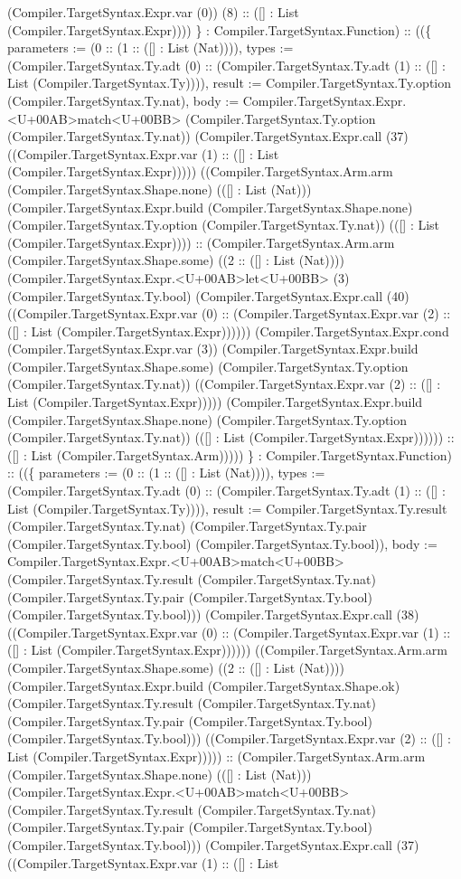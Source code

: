 \documentclass[11pt]{article}
\begin{document}
(Compiler.TargetSyntax.Expr.var (0)) (8) :: ([] : List (Compiler.TargetSyntax.Expr)))) \} : Compiler.TargetSyntax.Function) :: ((\{ parameters := (0 :: (1 :: ([] : List (Nat)))), types := (Compiler.TargetSyntax.Ty.adt (0) :: (Compiler.TargetSyntax.Ty.adt (1) :: ([] : List (Compiler.TargetSyntax.Ty)))), result := Compiler.TargetSyntax.Ty.option (Compiler.TargetSyntax.Ty.nat), body := Compiler.TargetSyntax.Expr.<U+00AB>match<U+00BB> (Compiler.TargetSyntax.Ty.option (Compiler.TargetSyntax.Ty.nat)) (Compiler.TargetSyntax.Expr.call (37) ((Compiler.TargetSyntax.Expr.var (1) :: ([] : List (Compiler.TargetSyntax.Expr))))) ((Compiler.TargetSyntax.Arm.arm (Compiler.TargetSyntax.Shape.none) (([] : List (Nat))) (Compiler.TargetSyntax.Expr.build (Compiler.TargetSyntax.Shape.none) (Compiler.TargetSyntax.Ty.option (Compiler.TargetSyntax.Ty.nat)) (([] : List (Compiler.TargetSyntax.Expr)))) :: (Compiler.TargetSyntax.Arm.arm (Compiler.TargetSyntax.Shape.some) ((2 :: ([] : List (Nat)))) (Compiler.TargetSyntax.Expr.<U+00AB>let<U+00BB> (3) (Compiler.TargetSyntax.Ty.bool) (Compiler.TargetSyntax.Expr.call (40) ((Compiler.TargetSyntax.Expr.var (0) :: (Compiler.TargetSyntax.Expr.var (2) :: ([] : List (Compiler.TargetSyntax.Expr)))))) (Compiler.TargetSyntax.Expr.cond (Compiler.TargetSyntax.Expr.var (3)) (Compiler.TargetSyntax.Expr.build (Compiler.TargetSyntax.Shape.some) (Compiler.TargetSyntax.Ty.option (Compiler.TargetSyntax.Ty.nat)) ((Compiler.TargetSyntax.Expr.var (2) :: ([] : List (Compiler.TargetSyntax.Expr))))) (Compiler.TargetSyntax.Expr.build (Compiler.TargetSyntax.Shape.none) (Compiler.TargetSyntax.Ty.option (Compiler.TargetSyntax.Ty.nat)) (([] : List (Compiler.TargetSyntax.Expr)))))) :: ([] : List (Compiler.TargetSyntax.Arm))))) \} : Compiler.TargetSyntax.Function) :: ((\{ parameters := (0 :: (1 :: ([] : List (Nat)))), types := (Compiler.TargetSyntax.Ty.adt (0) :: (Compiler.TargetSyntax.Ty.adt (1) :: ([] : List (Compiler.TargetSyntax.Ty)))), result := Compiler.TargetSyntax.Ty.result (Compiler.TargetSyntax.Ty.nat) (Compiler.TargetSyntax.Ty.pair (Compiler.TargetSyntax.Ty.bool) (Compiler.TargetSyntax.Ty.bool)), body := Compiler.TargetSyntax.Expr.<U+00AB>match<U+00BB> (Compiler.TargetSyntax.Ty.result (Compiler.TargetSyntax.Ty.nat) (Compiler.TargetSyntax.Ty.pair (Compiler.TargetSyntax.Ty.bool) (Compiler.TargetSyntax.Ty.bool))) (Compiler.TargetSyntax.Expr.call (38) ((Compiler.TargetSyntax.Expr.var (0) :: (Compiler.TargetSyntax.Expr.var (1) :: ([] : List (Compiler.TargetSyntax.Expr)))))) ((Compiler.TargetSyntax.Arm.arm (Compiler.TargetSyntax.Shape.some) ((2 :: ([] : List (Nat)))) (Compiler.TargetSyntax.Expr.build (Compiler.TargetSyntax.Shape.ok) (Compiler.TargetSyntax.Ty.result (Compiler.TargetSyntax.Ty.nat) (Compiler.TargetSyntax.Ty.pair (Compiler.TargetSyntax.Ty.bool) (Compiler.TargetSyntax.Ty.bool))) ((Compiler.TargetSyntax.Expr.var (2) :: ([] : List (Compiler.TargetSyntax.Expr))))) :: (Compiler.TargetSyntax.Arm.arm (Compiler.TargetSyntax.Shape.none) (([] : List (Nat))) (Compiler.TargetSyntax.Expr.<U+00AB>match<U+00BB> (Compiler.TargetSyntax.Ty.result (Compiler.TargetSyntax.Ty.nat) (Compiler.TargetSyntax.Ty.pair (Compiler.TargetSyntax.Ty.bool) (Compiler.TargetSyntax.Ty.bool))) (Compiler.TargetSyntax.Expr.call (37) ((Compiler.TargetSyntax.Expr.var (1) :: ([] : List 
\end{document}
